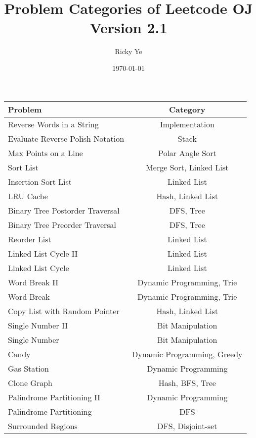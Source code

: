 \documentclass[paper=a4, fontsize=11pt]{scrartcl} %
\begin{document}
\title{Problem Categories of Leetcode OJ\\\textnormal{\small{Version 2.1}}}
\author{Ricky Ye}
\date{\today}
\maketitle

\setlength\parindent{0pt}
\small
\begin{center}
  \begin{longtable}{|l|c|}
    \hline
    \textbf{Problem}        &   \textbf{Category}    \\
    \hline
    Reverse Words in a String   &   Implementation  \\
    Evaluate Reverse Polish Notation    &   Stack   \\
    Max Points on a Line    &   Polar Angle Sort    \\
    Sort List   &   Merge Sort, Linked List \\
    Insertion Sort List &   Linked List \\
    LRU Cache   &   Hash, Linked List\\
    Binary Tree Postorder Traversal &   DFS, Tree   \\
    Binary Tree Preorder Traversal  &   DFS, Tree   \\
    Reorder List    &   Linked List \\
    Linked List Cycle II    &   Linked List \\
    Linked List Cycle   &   Linked List \\
    Word Break II   &   Dynamic Programming, Trie\\
    Word Break  &   Dynamic Programming, Trie\\
    Copy List with Random Pointer   &   Hash, Linked List\\
    Single Number II    &   Bit Manipulation    \\
    Single Number   &   Bit Manipulation    \\
    Candy   &    Dynamic Programming, Greedy\\
    Gas Station &   Dynamic Programming \\
    Clone Graph &   Hash, BFS, Tree \\
    Palindrome Partitioning II  &   Dynamic Programming \\
    Palindrome Partitioning &   DFS   \\
    Surrounded Regions  &   DFS, Disjoint-set    \\

\end{longtable}
\end{center}
\end{document}
